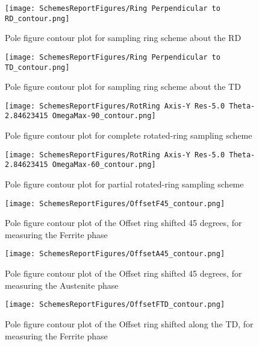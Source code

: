 \documentclass{article}
\begin{document}
\begin{figure}[ht]
    \centering
    \texttt{[image: SchemesReportFigures/Ring Perpendicular to RD\_contour.png]}
    \caption{Pole figure contour plot for sampling ring scheme about the RD}
\end{figure}

\begin{figure}[ht]
    \centering
    \texttt{[image: SchemesReportFigures/Ring Perpendicular to TD\_contour.png]}
    \caption{Pole figure contour plot for sampling ring scheme about the TD}
\end{figure}





\begin{figure}[ht]
    \centering
    \texttt{[image: SchemesReportFigures/RotRing Axis-Y Res-5.0 Theta-2.84623415 OmegaMax-90\_contour.png]}
    \caption{Pole figure contour plot for complete rotated-ring sampling scheme}
\end{figure}

\begin{figure}[ht]
    \centering
    \texttt{[image: SchemesReportFigures/RotRing Axis-Y Res-5.0 Theta-2.84623415 OmegaMax-60\_contour.png]}
    \caption{Pole figure contour plot for partial rotated-ring sampling scheme}
\end{figure}

\begin{figure}[ht]
    \centering
    \texttt{[image: SchemesReportFigures/OffsetF45\_contour.png]}
    \caption{Pole figure contour plot of the Offset ring shifted 45 degrees, for measuring the Ferrite phase}
\end{figure}

\begin{figure}[ht]
    \centering
    \texttt{[image: SchemesReportFigures/OffsetA45\_contour.png]}
    \caption{Pole figure contour plot of the Offset ring shifted 45 degrees, for measuring the Austenite phase}
\end{figure}

\begin{figure}[ht]
    \centering
    \texttt{[image: SchemesReportFigures/OffsetFTD\_contour.png]}
    \caption{Pole figure contour plot of the Offset ring shifted along the TD, for measuring the Ferrite phase}
\end{figure}
\end{document}
